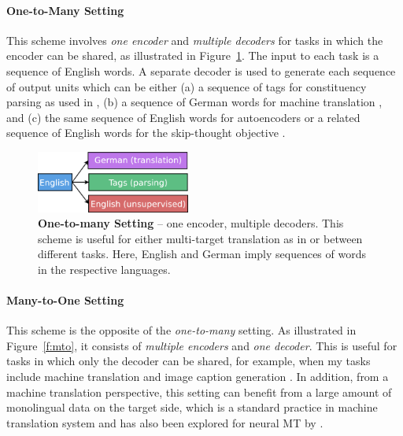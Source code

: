 \paragraph{One-to-Many Setting}
This scheme involves {\it one encoder} and {\it multiple decoders} for tasks in
which the encoder can be shared, as illustrated in
Figure~\ref{f:otm}. The input to each task is a sequence of
English words. A separate decoder is used to generate each sequence of
output units which can be either (a) a sequence of tags for
constituency parsing as used in \citep{vinyals15grammar}, (b) a
sequence of German words for machine translation \citep{luong15attn},
and (c) the same sequence of English words for autoencoders or a
related sequence of English words for the skip-thought objective
\citep{kiros15skip}.

\begin{figure}[tbh]
\centering
\includegraphics[width=0.45\textwidth, clip=true, trim= 0 0 0
0]{img/6-1_otm}
\caption[One-to-many Setting]{{\bf One-to-many Setting} -- one encoder, multiple decoders. This scheme
is useful for either multi-target translation as
in \cite{dong15} or between different tasks. Here, English and
German imply sequences of words in the respective languages. 
} 
\label{f:otm}
\end{figure}

\paragraph{Many-to-One Setting}
This scheme is the opposite of the {\it one-to-many}
setting. As illustrated in Figure~\ref{f:mto}, it consists of {\it multiple
encoders} and {\it one decoder}. This is useful for tasks in which only the
decoder can be shared, for example, when my tasks include machine translation
and image caption generation \citep{vinyals15caption}. In addition, from a machine
translation perspective, this setting can benefit from a large
amount of monolingual data on the target side, which is a standard
practice in machine translation system and has also been explored
for neural MT by \cite{gulcehre2015using}.

